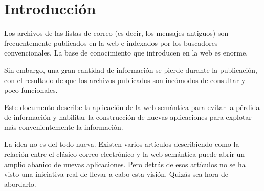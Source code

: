 
\section{Introducción}

Los archivos de las listas de correo (es decir, los mensajes antiguos) son
frecuentemente publicados en la web e indexados por los buscadores convencionales.
La base de conocimiento que introducen en la web es enorme.

Sin embargo, una gran cantidad de información se pierde durante la publicación,
con el resultado de que los archivos publicados son incómodos de consultar
y poco funcionales.

Este documento describe la aplicación de la web semántica para evitar la
pérdida de información y habilitar la construcción de nuevas aplicaciones
para explotar más convenientemente la información.

La idea no es del todo nueva\cite{Luke2004}. Existen varios artículos
describiendo como la relación entre el clásico correo electrónico y la
web semántica puede abrir un amplio abanico de nuevas aplicaciones. Pero
detrás de esos artículos no se ha visto una iniciativa real de llevar a
cabo esta visión. Quizás sea hora de abordarlo.
